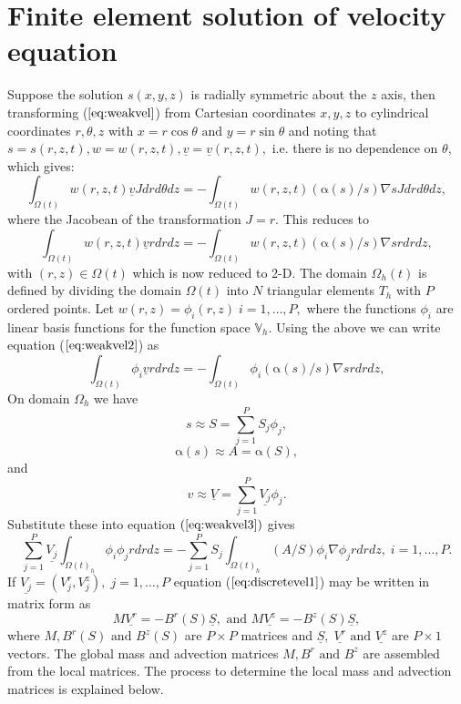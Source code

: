 \documentclass[11pt]{article}
\newcommand{\ul}{\underline}
\newcommand{\bigv}{\mathbb{V}}
\newcommand{\Om}{\Omega}
\newcommand{\al}{\mathrm{\alpha}}
\begin{document}
\section{Finite element solution of velocity equation}
Suppose the solution $s(x,y,z)$ is radially symmetric about the $z$ axis, then transforming ($\ref{eq:weakvel}$) from Cartesian coordinates $x,y,z$ to cylindrical coordinates $r,\theta,z$ with $x = r\cos{\theta} \text{ and } y = r\sin{\theta} $ and noting that $s = s(r,z,t), w = w(r,z,t), \underline{v}=\underline{v}(r,z,t), $ i.e. there is no dependence on $\theta$, which gives:
\begin{equation}
\label{eq:weakvel1} 
\int_{\Omega(t)}w(r,z,t)\underline{v}Jdrd{\theta}dz = -\int_{\Omega(t)}w(r,z,t)(\al(s)/s)\nabla{s}Jdrd{\theta}dz,
\end{equation}
where the Jacobean of the transformation $J=r$.  This reduces to 
\begin{equation}
\label{eq:weakvel2} 
\int_{\Omega(t)} w(r,z,t)\underline{v}rdrdz = -\int_{\Omega(t)}w(r,z,t)(\al{(s)}/s)\nabla{s}rdrdz,
\end{equation}
with $(r,z) \in \Omega(t)$ which is now reduced to 2-D.
The domain $\Omega_h(t)$ is defined by dividing the domain $\Om(t)$ into $N$ triangular elements $T_h$ with $P$ ordered points.
Let $w(r,z) = \phi_i(r,z) \; i = 1,\dots,P,$ where the functions $\phi_i$ are linear basis functions for the function space $\bigv_h$. 
Using the above we can write equation ($\ref{eq:weakvel2}$) as
\begin{equation}
\label{eq:weakvel3} 
\int_{\Omega(t)} \phi_i\ul{v}rdrdz = -\int_{\Omega(t)}\phi_i(\al{(s)}/s)\nabla{s}rdrdz,
\end{equation}
On domain $\Omega_h$ we have $$s\approx S = \sum_{j=1}^PS_j\phi_j,$$
$$\al(s) \approx A = \al{(S)},$$
and
$$v\approx \ul{V} = \sum_{j=1}^P\ul{V_j}\phi_j.$$
Substitute these into equation $(\ref{eq:weakvel3})$ gives
\begin{equation}
\label{eq:discretevel1}
\sum_{j=1}^P\ul{V_j}\int_{{\Omega(t)}_h}\phi_i\phi_jrdrdz = -\sum_{j=1}^P{S}_j\int_{{\Omega(t)}_h}(A/S)\phi_i\nabla{\phi_j}rdrdz, \; i = 1,\dots,P.
\end{equation}
If $\ul{V_j} = (V_j^r,V_j^z), \; j = 1,\dots,P$ equation ($\ref{eq:discretevel1}$) may be written in matrix form as
\begin{equation}
\label{eq:matformvel}
M\ul{V^r} = -B^r(S)\ul{S}, \text{ and } M\ul{V^z} = -B^z(S)\ul{S},
\end{equation}
where $M, B^r(S) \text{ and } B^z(S)$ are $P \times P$ matrices and $\ul{S},\;\ul{V^r} \text{ and }  \ul{V^z}$ are $P \times 1$ vectors. The global mass and advection matrices $M, B^r \text{ and } B^z$ are assembled from the local matrices. The process to determine the local mass and advection matrices is explained below.\\
\end{document}
